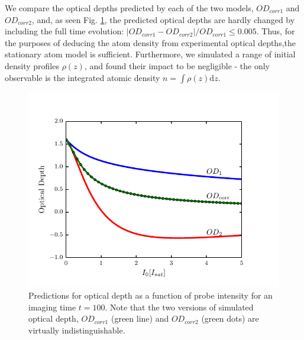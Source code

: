\documentclass[12pt]{iopart}
\begin{document}
\par We compare the optical depths predicted by each of the two models, $OD_{corr1}$ and $OD_{corr2}$, and, as seen Fig. \ref{fig:atomTravel}, the predicted optical depths are hardly changed by including the full time evolution:  $\left|OD_{corr1}-OD_{corr2}\right|/OD_{corr1} \le 0.005$. Thus, for the purposes of deducing the atom density from experimental optical depths,the stationary atom model is sufficient. Furthermore, we simulated a range of initial density profiles $\rho(z)$, and found their impact to be negligible - the only observable is the integrated atomic density $n=\int\rho(z)\mathrm{d}z$. 
\begin{figure}
	\includegraphics{figure7.pdf}
\caption{Predictions for optical depth as a function of probe intensity for an imaging time $t=100$\us. Note that the two versions of simulated optical depth, $OD_{corr1}$ (green line) and $OD_{corr2}$ (green dots) are virtually indistinguishable. }  
\label{fig:atomTravel}
\end{figure}
\end{document}
